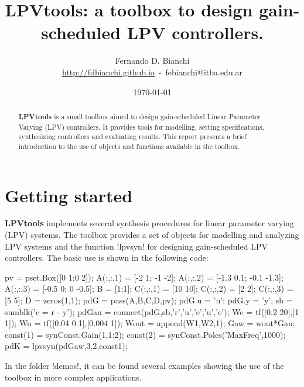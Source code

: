 \documentclass[fleqn,11pt]{article}
\makeatletter
\newcommand{\ver}{version 0.10\xspace}
\newcommand{\auth}{Fernando D. Bianchi}
\newcommand{\email}{febianchi@itba.edu.ar}
\newcommand{\web}{http://fdbianchi.github.io}
\newcommand{\weblink}[1]{\url{#1}}
\newcommand{\lpvtool}{\textbf{LPVtools}\xspace}
\makeatother
\begin{document}
\title{\lpvtool: a toolbox to design gain-scheduled LPV controllers.}
\author{\auth\\\weblink{\web}~-~\email}
\date{\mydate\today}
%
\maketitle{}

\begin{abstract}
    \lpvtool is a small toolbox aimed to design gain-scheduled Linear Parameter Varying (LPV) controllers. It provides tools for modelling, setting specifications, synthesizing controllers and evaluating results. This report presents a brief introduction to the use of objects and functions available in the toolbox.
\end{abstract}



\section{Getting started}\label{sec:gt}

\lpvtool implements several synthesis procedures for linear parameter varying (LPV) systems. The toolbox provides a set of objects for modelling and analyzing LPV systems and the function !lpvsyn! for designing gain-scheduled LPV controllers. The basic use is shown in the following code:

\begin{code}
pv = pset.Box([0 1;0 2]);
A(:,:,1) = [-2 1; -1 -2];
A(:,:,2) = [-1.3 0.1; -0.1 -1.3];
A(:,:,3) = [-0.5 0; 0 -0.5];
B        = [1;1];
C(:,:,1) = [10 10];
C(:,:,2) = [2 2];
C(:,:,3) = [5 5];
D = zeros(1,1);
pdG = pass(A,B,C,D,pv);
pdG.u = 'u';    pdG.y = 'y';
sb    = sumblk('e = r - y');
pdGau = connect(pdG,sb,{'r','u'},{'e','u','e'});
We = tf([0.2 20],[1 1]);
Wu = tf([0.04 0.1],[0.004 1]);
Wout = append(W1,W2,1);
Gaw = wout*Gau;
const(1) = synConst.Gain(1,1:2);
const(2) = synConst.Poles('MaxFreq',1000);
pdK = lpvsyn(pdGaw,3,2,const1);
\end{code}

In the folder !demos!, it can be found several examples showing the use of the toolbox in more complex applications.
\end{document}
